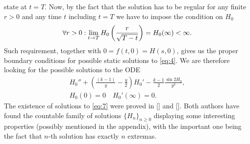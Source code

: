 state at $t=T$. Now, by the fact that the solution has to be regular
for any finite $r>0$ and any time $t$ including $t=T$ we have to
impose the condition on $H_0$
\begin{align}
  \label{eq:1}
  \forall{r>0}:\lim_{t\rightarrow
    T}H_0\left(\frac{r}{\sqrt{T-t}}\right)=H_0(\infty)<\infty.
\end{align}
Such requirement, together with $0=f(t,0)=H(s,0)$, gives us the proper
boundary conditions for possible static solutions to \eqref{eq:4}. We
are therefore looking for the possible solutions to the ODE
\begin{align}
  \label{eq:7}
  H_0''+\left(\frac{(k-1)}{y}-\frac{y}{2}\right)H_0'-\frac{k-1}{2}\frac{\sin2H_0}{y^2},\\
  H_0(0)=0\quad H_0'(\infty)=0.
\end{align}
The existence of solutions to \eqref{eq:7} were proved in [] and
[]. Both authors have found the countable family of solutions
$\{H_n\}_{n\ge0}$ displaying some interesting properties (possibly
mentioned in the appendix), with the important one being the fact that
$n$-th solution has exactly $n$ extremas.\\

